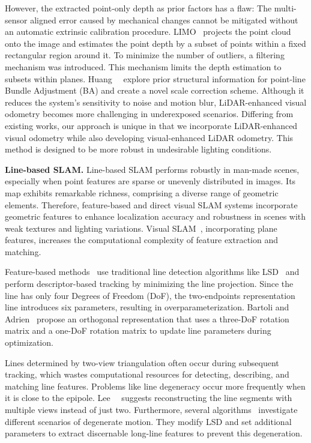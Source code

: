 However, the extracted point-only depth as prior factors has a flaw: The multi-sensor aligned error caused by mechanical changes cannot be mitigated without an automatic extrinsic calibration procedure.
LIMO~\cite{graeter2018limo} projects the point cloud onto the image and estimates the point depth by a subset of points within a fixed rectangular region around it. To minimize the number of outliers, a filtering mechanism was introduced. This mechanism limits the depth estimation to subsets within planes.
Huang~\etal~\cite{huang2020LiDAR} explore prior structural information for point-line Bundle Adjustment (BA) and create a novel scale correction scheme.
Although it reduces the system's sensitivity to noise and motion blur, LiDAR-enhanced visual odometry becomes more challenging in underexposed scenarios.
Differing from existing works, our approach is unique in that we incorporate LiDAR-enhanced visual odometry while also developing visual-enhanced LiDAR odometry. This method is designed to be more robust in undesirable lighting conditions.

\noindent\textbf{Line-based SLAM.}
Line-based SLAM performs robustly in man-made scenes, especially when point features are sparse or unevenly distributed in images.
Its map exhibits remarkable richness, comprising a diverse range of geometric elements. Therefore, feature-based and direct visual SLAM systems incorporate geometric features to enhance localization accuracy and robustness in scenes with weak textures and lighting variations.
Visual SLAM~\cite{ram2021rp,  shu2022structure, zhang2020plane}, incorporating plane features, increases the computational complexity of feature extraction and matching.

Feature-based methods~\cite{gee2006real, gomez2019pl, pumarola2017pl, smith2006real} use traditional line detection algorithms like LSD~\cite{engel2014lsd} and perform descriptor-based tracking by minimizing the line projection.
Since the line has only four Degrees of Freedom (DoF), the two-endpoints representation line introduces six parameters, resulting in overparameterization.
Bartoli and Adrien~\cite{bartoli2005structure} propose an orthogonal representation that uses a three-DoF rotation matrix and a one-DoF rotation matrix to update line parameters during optimization.

Lines determined by two-view triangulation often occur during subsequent tracking, which wastes computational resources for detecting, describing, and matching line features.
Problems like line degeneracy occur more frequently when it is close to the epipole.
Lee~\etal~\cite{lee2019elaborate} suggests reconstructing the line segments with multiple views instead of just two.
Furthermore, several algorithms~\cite{lim2021avoiding, yang2019visual} investigate different scenarios of degenerate motion.
They modify LSD and set additional parameters to extract discernable long-line features to prevent this degeneration.

